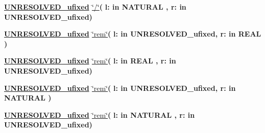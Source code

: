 \begin{DoxyCompactItemize}
\item 
{\bfseries {\bfseries {\bfseries \hyperlink{classfixed__pkg_ae78bc2b36d22f6abeac163955e8a587d}{U\+N\+R\+E\+S\+O\+L\+V\+E\+D\+\_\+ufixed}} \textcolor{vhdlchar}{ }}} \hyperlink{classfixed__pkg_ab2a8e4ea631432a5f115c76c3e709388}{\char`\"{}/\char`\"{}}{\bfseries  ( }{\bfseries \textcolor{vhdlchar}{l\+: }\textcolor{stringliteral}{in }{\bfseries \textcolor{comment}{N\+A\+T\+U\+R\+A\+L}\textcolor{vhdlchar}{ }}}{\bfseries  , \textcolor{vhdlchar}{r\+: }\textcolor{stringliteral}{in }\textcolor{vhdlchar}{U\+N\+R\+E\+S\+O\+L\+V\+E\+D\+\_\+ufixed}}{\bfseries  )} 
\item 
{\bfseries {\bfseries {\bfseries \hyperlink{classfixed__pkg_ae78bc2b36d22f6abeac163955e8a587d}{U\+N\+R\+E\+S\+O\+L\+V\+E\+D\+\_\+ufixed}} \textcolor{vhdlchar}{ }}} \hyperlink{classfixed__pkg_a66a380593306e6133903e7a5cb03056a}{\char`\"{}rem\char`\"{}}{\bfseries  ( }{\bfseries \textcolor{vhdlchar}{l\+: }\textcolor{stringliteral}{in }\textcolor{vhdlchar}{U\+N\+R\+E\+S\+O\+L\+V\+E\+D\+\_\+ufixed}}{\bfseries  , \textcolor{vhdlchar}{r\+: }\textcolor{stringliteral}{in }{\bfseries \textcolor{comment}{R\+E\+A\+L}\textcolor{vhdlchar}{ }}}{\bfseries  )} 
\item 
{\bfseries {\bfseries {\bfseries \hyperlink{classfixed__pkg_ae78bc2b36d22f6abeac163955e8a587d}{U\+N\+R\+E\+S\+O\+L\+V\+E\+D\+\_\+ufixed}} \textcolor{vhdlchar}{ }}} \hyperlink{classfixed__pkg_a66a380593306e6133903e7a5cb03056a}{\char`\"{}rem\char`\"{}}{\bfseries  ( }{\bfseries \textcolor{vhdlchar}{l\+: }\textcolor{stringliteral}{in }{\bfseries \textcolor{comment}{R\+E\+A\+L}\textcolor{vhdlchar}{ }}}{\bfseries  , \textcolor{vhdlchar}{r\+: }\textcolor{stringliteral}{in }\textcolor{vhdlchar}{U\+N\+R\+E\+S\+O\+L\+V\+E\+D\+\_\+ufixed}}{\bfseries  )} 
\item 
{\bfseries {\bfseries {\bfseries \hyperlink{classfixed__pkg_ae78bc2b36d22f6abeac163955e8a587d}{U\+N\+R\+E\+S\+O\+L\+V\+E\+D\+\_\+ufixed}} \textcolor{vhdlchar}{ }}} \hyperlink{classfixed__pkg_a66a380593306e6133903e7a5cb03056a}{\char`\"{}rem\char`\"{}}{\bfseries  ( }{\bfseries \textcolor{vhdlchar}{l\+: }\textcolor{stringliteral}{in }\textcolor{vhdlchar}{U\+N\+R\+E\+S\+O\+L\+V\+E\+D\+\_\+ufixed}}{\bfseries  , \textcolor{vhdlchar}{r\+: }\textcolor{stringliteral}{in }{\bfseries \textcolor{comment}{N\+A\+T\+U\+R\+A\+L}\textcolor{vhdlchar}{ }}}{\bfseries  )} 
\item 
{\bfseries {\bfseries {\bfseries \hyperlink{classfixed__pkg_ae78bc2b36d22f6abeac163955e8a587d}{U\+N\+R\+E\+S\+O\+L\+V\+E\+D\+\_\+ufixed}} \textcolor{vhdlchar}{ }}} \hyperlink{classfixed__pkg_a66a380593306e6133903e7a5cb03056a}{\char`\"{}rem\char`\"{}}{\bfseries  ( }{\bfseries \textcolor{vhdlchar}{l\+: }\textcolor{stringliteral}{in }{\bfseries \textcolor{comment}{N\+A\+T\+U\+R\+A\+L}\textcolor{vhdlchar}{ }}}{\bfseries  , \textcolor{vhdlchar}{r\+: }\textcolor{stringliteral}{in }\textcolor{vhdlchar}{U\+N\+R\+E\+S\+O\+L\+V\+E\+D\+\_\+ufixed}}{\bfseries  )} 

\end{DoxyCompactItemize}
